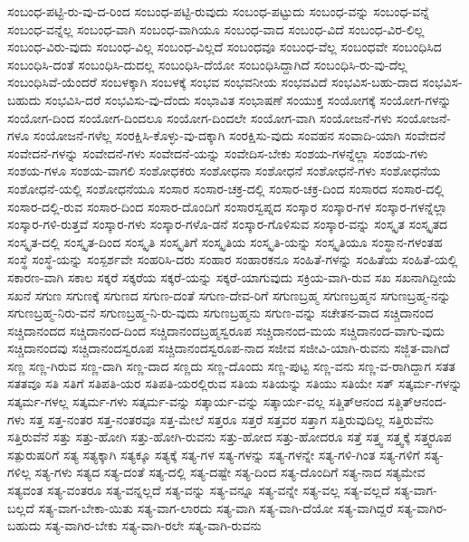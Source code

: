 {ಸಂಬಂಧ-ಪಟ್ಟಿ-ರು-ವು-ದ-ರಿಂದ
ಸಂಬಂಧ-ಪಟ್ಟಿ-ರುವುದು
ಸಂಬಂಧ-ಪಟ್ಟುದು
ಸಂಬಂಧ-ವನ್ನು
ಸಂಬಂಧ-ವನ್ನೆ
ಸಂಬಂಧ-ವನ್ನೆಲ್ಲ
ಸಂಬಂಧ-ವಾಗಿ
ಸಂಬಂಧ-ವಾಗಿಯೂ
ಸಂಬಂಧ-ವಾದ
ಸಂಬಂಧ-ವಿದೆ
ಸಂಬಂಧ-ವಿರ-ಲಿಲ್ಲ
ಸಂಬಂಧ-ವಿರು-ವುದು
ಸಂಬಂಧ-ವಿಲ್ಲ
ಸಂಬಂಧ-ವಿಲ್ಲದೆ
ಸಂಬಂಧವೂ
ಸಂಬಂಧ-ವೆಲ್ಲ
ಸಂಬಂಧವೇ
ಸಂಬಂಧಿಸಿದ
ಸಂಬಂಧಿಸಿ-ದಂತೆ
ಸಂಬಂಧಿಸಿ-ದುದಲ್ಲ
ಸಂಬಂಧಿಸಿ-ದೆಯೋ
ಸಂಬಂಧಿಸಿದ್ದಾಗಿದೆ
ಸಂಬಂಧಿಸಿ-ರು-ವು-ದೆಲ್ಲ
ಸಂಬಂಧಿಸಿವೆ-ಯೆಂದರೆ
ಸಂಬಳಕ್ಕಾಗಿ
ಸಂಬಳಕ್ಕೆ
ಸಂಭವ
ಸಂಭವನೀಯ
ಸಂಭವವಿದೆ
ಸಂಭವಿಸ-ಬಹು-ದಾದ
ಸಂಭವಿಸ-ಬಹುದು
ಸಂಭವಿಸಿ-ದರೆ
ಸಂಭವಿಸು-ವು-ದೆಂದು
ಸಂಭಾವಿತ
ಸಂಭಾಷಣೆ
ಸಂಯುಕ್ತ
ಸಂಯೋಗಕ್ಕೆ
ಸಂಯೋಗ-ಗಳನ್ನು
ಸಂಯೋಗ-ದಿಂದ
ಸಂಯೋಗ-ದಿಂದಲೂ
ಸಂಯೋಗ-ದಿಂದಲೇ
ಸಂಯೋಗ-ವಾಗಿ
ಸಂಯೋಜನೆ-ಗಳು
ಸಂಯೋಜನೆ-ಗಳೂ
ಸಂಯೋಜನೆ-ಗಳೆಲ್ಲ
ಸಂರಕ್ಷಿಸಿ-ಕೊಳ್ಳು-ವು-ದಕ್ಕಾಗಿ
ಸಂರಕ್ಷಿಸು-ವುದು
ಸಂವಹನ
ಸಂವಾದಿ-ಯಾಗಿ
ಸಂವೇದನೆ
ಸಂವೇದನೆ-ಗಳನ್ನು
ಸಂವೇದನೆ-ಗಳು
ಸಂವೇದನೆ-ಯನ್ನು
ಸಂವೇದಿಸ-ಬೇಕು
ಸಂಶಯ-ಗಳನ್ನೆಲ್ಲಾ
ಸಂಶಯ-ಗಳು
ಸಂಶಯ-ಗಳೂ
ಸಂಶಯ-ವಾಗಲಿ
ಸಂಶೋಧಕರು
ಸಂಶೋಧನಾ
ಸಂಶೋಧನೆ
ಸಂಶೋಧನೆ-ಗಳು
ಸಂಶೋಧನೆಯ
ಸಂಶೋಧನೆ-ಯಲ್ಲಿ
ಸಂಶೋಧನೆಯೂ
ಸಂಸಾರ
ಸಂಸಾರ-ಚಕ್ರ-ದಲ್ಲಿ
ಸಂಸಾರ-ಚಕ್ರ-ದಿಂದ
ಸಂಸಾರದ
ಸಂಸಾರ-ದಲ್ಲಿ
ಸಂಸಾರ-ದಲ್ಲಿ-ರುವ
ಸಂಸಾರ-ದಿಂದ
ಸಂಸಾರ-ದೊಂದಿಗೆ
ಸಂಸಾರಸ್ವಪ್ನದ
ಸಂಸ್ಕಾರ
ಸಂಸ್ಕಾರ-ಗಳ
ಸಂಸ್ಕಾರ-ಗಳನ್ನೆಲ್ಲಾ
ಸಂಸ್ಕಾರ-ಗಳಿ-ರುತ್ತವೆ
ಸಂಸ್ಕಾರ-ಗಳು
ಸಂಸ್ಕಾರ-ಗಳೊ-ಡನೆ
ಸಂಸ್ಕಾರ-ಗೊಳಿಸುವ
ಸಂಸ್ಕಾರ-ವನ್ನು
ಸಂಸ್ಕೃತ
ಸಂಸ್ಕೃತದ
ಸಂಸ್ಕೃತ-ದಲ್ಲಿ
ಸಂಸ್ಕೃತ-ದಿಂದ
ಸಂಸ್ಕೃತಿ
ಸಂಸ್ಕೃತಿಗೆ
ಸಂಸ್ಕೃತಿಯ
ಸಂಸ್ಕೃತಿ-ಯನ್ನು
ಸಂಸ್ಕೃತಿಯೂ
ಸಂಸ್ಥಾನ-ಗಳಂತಹ
ಸಂಸ್ಥೆ
ಸಂಸ್ಥೆ-ಯನ್ನು
ಸಂಸ್ಪರ್ಶವೇ
ಸಂಹರಿಸಿ-ದರು
ಸಂಹಾರ
ಸಂಹಾರಕನೂ
ಸಂಹಿತೆ-ಗಳನ್ನು
ಸಂಹಿತೆಯ
ಸಂಹಿತೆ-ಯಲ್ಲಿ
ಸಕಾರಣ-ವಾಗಿ
ಸಕಾಲ
ಸಕ್ಕರೆ
ಸಕ್ಕರೆಯ
ಸಕ್ಕರೆ-ಯನ್ನು
ಸಕ್ಕರೆ-ಯಾಗುವುದು
ಸಕ್ರಿಯ-ವಾಗಿ-ರುವ
ಸಖ
ಸಖನಾಗಿದ್ದೀಯೆ
ಸಖನೆ
ಸಗುಣ
ಸಗುಣಕ್ಕೆ
ಸಗುಣದ
ಸಗುಣ-ದಂತೆ
ಸಗುಣ-ದೇವ-ರಿಗೆ
ಸಗುಣಬ್ರಹ್ಮ
ಸಗುಣಬ್ರಹ್ಮನ
ಸಗುಣಬ್ರಹ್ಮ-ನನ್ನು
ಸಗುಣಬ್ರಹ್ಮ-ನಿರು-ವನೆ
ಸಗುಣಬ್ರಹ್ಮ-ನಿ-ರು-ವುದು
ಸಗುಣಬ್ರಹ್ಮನು
ಸಗುಣ-ವನ್ನು
ಸಚೇತನ-ವಾದ
ಸಚ್ಚಿದಾನಂದ
ಸಚ್ಚಿದಾನಂದದ
ಸಚ್ಚಿದಾನಂದ-ದಿಂದ
ಸಚ್ಚಿದಾನಂದಬ್ರಹ್ಮಸ್ವರೂಪ
ಸಚ್ಚಿದಾನಂದ-ಮಯ
ಸಚ್ಚಿದಾನಂದ-ವಾಗು-ವುದು
ಸಚ್ಚಿದಾನಂದವು
ಸಚ್ಚಿದಾನಂದಸ್ವರೂಪ
ಸಚ್ಚಿದಾನಂದಸ್ವರೂಪ-ನಾದ
ಸಜೀವ
ಸಜೀವಿ-ಯಾಗಿ-ರುವನು
ಸಜ್ಜಿತ-ವಾಗಿದೆ
ಸಣ್ಣ
ಸಣ್ಣ-ಗಿರುವ
ಸಣ್ಣ-ದಾಗಿ
ಸಣ್ಣ-ದಾದ
ಸಣ್ಣದು
ಸಣ್ಣ-ದೊಂದು
ಸಣ್ಣ-ಪುಟ್ಟ
ಸಣ್ಣ-ವನು
ಸಣ್ಣ-ವ-ರಾಗಿದ್ದಾಗ
ಸತತ
ಸತತವೂ
ಸತಿ
ಸತಿಗೆ
ಸತಿಪತಿ-ಯರ
ಸತಿಪತಿ-ಯರಲ್ಲಿರುವ
ಸತಿಯ
ಸತಿಯನ್ನು
ಸತಿಯು
ಸತಿಯೇ
ಸತ್
ಸತ್ಕರ್ಮ-ಗಳನ್ನು
ಸತ್ಕರ್ಮ-ಗಳಲ್ಲ
ಸತ್ಕರ್ಮ-ಗಳು
ಸತ್ಕರ್ಮ-ವನ್ನು
ಸತ್ಕಾರ್ಯ-ವನ್ನು
ಸತ್ಕಾರ್ಯ-ವಲ್ಲ
ಸತ್ಚಿತ್ಆನಂದ
ಸತ್ಚಿತ್ಆನಂದ-ಗಳು
ಸತ್ತ
ಸತ್ತ-ನಂತರ
ಸತ್ತ-ನಂತರವೂ
ಸತ್ತ-ಮೇಲೆ
ಸತ್ತರೂ
ಸತ್ತರೆ
ಸತ್ತವರ
ಸತ್ತಾಗ
ಸತ್ತಿರುವುದಿಲ್ಲ
ಸತ್ತಿರುವೆನು
ಸತ್ತಿರುವೆನೆ
ಸತ್ತು
ಸತ್ತು-ಹೋಗಿ
ಸತ್ತು-ಹೋಗಿ-ರುವನು
ಸತ್ತು-ಹೋದ
ಸತ್ತು-ಹೋದರೂ
ಸತ್ತೆ
ಸತ್ತ್ವ
ಸತ್ತ್ವಕ್ಕೆ
ಸತ್ತ್ವರೂಪ
ಸತ್ಪುರುಷರಿಗೆ
ಸತ್ಯ
ಸತ್ಯಕ್ಕಾಗಿ
ಸತ್ಯಕ್ಕೂ
ಸತ್ಯಕ್ಕೆ
ಸತ್ಯ-ಗಳ
ಸತ್ಯ-ಗಳನ್ನು
ಸತ್ಯ-ಗಳನ್ನೇ
ಸತ್ಯ-ಗಳಿ-ಗಿಂತ
ಸತ್ಯ-ಗಳಿಗೆ
ಸತ್ಯ-ಗಳಿಲ್ಲ
ಸತ್ಯ-ಗಳು
ಸತ್ಯದ
ಸತ್ಯ-ದಂತೆ
ಸತ್ಯ-ದಲ್ಲಿ
ಸತ್ಯ-ದಷ್ಟೇ
ಸತ್ಯ-ದಿಂದ
ಸತ್ಯ-ದೊಂದಿಗೆ
ಸತ್ಯ-ನಾದ
ಸತ್ಯಮೇವ
ಸತ್ಯವಂತ
ಸತ್ಯ-ವಂತರೂ
ಸತ್ಯ-ವನ್ನಲ್ಲದೆ
ಸತ್ಯ-ವನ್ನು
ಸತ್ಯ-ವನ್ನೂ
ಸತ್ಯ-ವನ್ನೇ
ಸತ್ಯ-ವಲ್ಲ
ಸತ್ಯ-ವಲ್ಲದೆ
ಸತ್ಯ-ವಾಗ-ಬಲ್ಲದೆ
ಸತ್ಯ-ವಾಗ-ಬೇಕಾ-ಯಿತು
ಸತ್ಯ-ವಾಗ-ಲಾರದು
ಸತ್ಯ-ವಾಗಿ
ಸತ್ಯ-ವಾಗಿ-ದೆಯೋ
ಸತ್ಯ-ವಾಗಿದ್ದರೆ
ಸತ್ಯ-ವಾಗಿರ-ಬಹುದು
ಸತ್ಯ-ವಾಗಿರ-ಬೇಕು
ಸತ್ಯ-ವಾಗಿ-ರಲೇ
ಸತ್ಯ-ವಾಗಿ-ರುವನು
}
